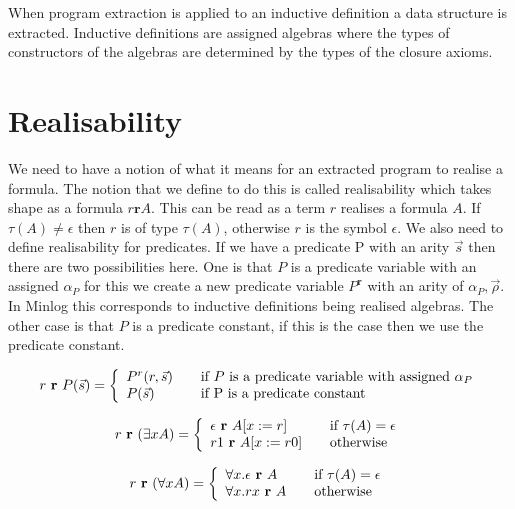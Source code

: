 When program extraction is applied to an inductive definition a data structure is extracted. Inductive definitions are assigned algebras 
where the types of constructors of the algebras are determined by the types of the closure axioms.
\section{Realisability}\label{sec:realisability}
We need to have a notion of what it means for an extracted program to realise
a formula. The notion that we define to do this is called realisability which takes shape as a formula $r \textbf{r} A$. This can be read as
a term $r$ realises a formula $A$. If $\tau(A) \neq \epsilon$ then $r$ is of type $\tau (A)$,
otherwise $r$ is the symbol $\epsilon$. We also need to define realisability
for predicates. If we have a predicate P
with an arity $\vec{s}$ then there are two possibilities here. One is that
$P$ is a predicate variable with an assigned $\alpha_P$ for this we create a new
predicate variable $P^{\textbf{r}}$ with an arity of $\alpha_P,\vec{\rho}$. In Minlog this corresponds to inductive definitions being realised algebras.
The other case is that $P$ is a predicate constant, if this is the case then
we use the predicate constant.



\[ r \ \textbf{r} \ P(\vec{s}) = \left\{ 
\begin{array}{l l}
P^r(r,\vec{s}) & \quad \text{if $P$ is a predicate variable with assigned $\alpha_P$} \\ 
P(\vec{s}) & \quad \text{if P is a predicate constant} \\

\end{array} \right.
\]

\[ r \ \textbf{r} \ (\exists x A) = \left\{ 
\begin{array}{l l}
\epsilon \ \textbf{r} \ A[x:=r] & \quad \text{if $\tau (A) = \epsilon$} \\ 
r1 \ \textbf{r} \ A[x:= r0] & \quad \text{otherwise} \\

\end{array} \right.
\]

\[ r \ \textbf{r} \ (\forall x A) = \left\{ 
\begin{array}{l l}
\forall x. \epsilon \ \textbf{r} \ A & \quad \text{if $\tau (A) = \epsilon$} \\ 
\forall x. rx \ \textbf{r} \ A & \quad \text{otherwise} \\

\end{array} \right.
\]


